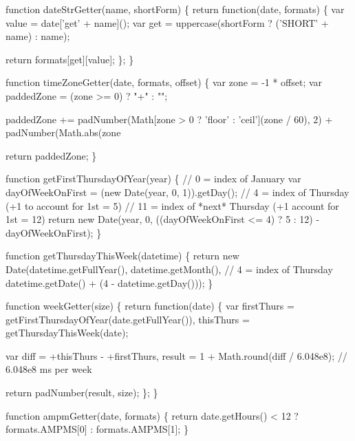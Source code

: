 \begin{DoxyCodeInclude}
{{{{\textcolor{keyword}{function} dateStrGetter(name, shortForm) \{
  \textcolor{keywordflow}{return} \textcolor{keyword}{function}(date, formats) \{
    var value = date[\textcolor{stringliteral}{'get'} + name]();
    var \textcolor{keyword}{get} = uppercase(shortForm ? (\textcolor{stringliteral}{'SHORT'} + name) : name);

    \textcolor{keywordflow}{return} formats[\textcolor{keyword}{get}][value];
  \};
\}

\textcolor{keyword}{function} timeZoneGetter(date, formats, offset) \{
  var zone = -1 * offset;
  var paddedZone = (zone >= 0) ? \textcolor{stringliteral}{"+"} : \textcolor{stringliteral}{""};

  paddedZone += padNumber(Math[zone > 0 ? \textcolor{stringliteral}{'floor'} : \textcolor{stringliteral}{'ceil'}](zone / 60), 2) +
                padNumber(Math.abs(zone %

  \textcolor{keywordflow}{return} paddedZone;
\}

\textcolor{keyword}{function} getFirstThursdayOfYear(year) \{
    \textcolor{comment}{// 0 = index of January}
    var dayOfWeekOnFirst = (\textcolor{keyword}{new} Date(year, 0, 1)).getDay();
    \textcolor{comment}{// 4 = index of Thursday (+1 to account for 1st = 5)}
    \textcolor{comment}{// 11 = index of *next* Thursday (+1 account for 1st = 12)}
    \textcolor{keywordflow}{return} \textcolor{keyword}{new} Date(year, 0, ((dayOfWeekOnFirst <= 4) ? 5 : 12) - dayOfWeekOnFirst);
\}

\textcolor{keyword}{function} getThursdayThisWeek(datetime) \{
    \textcolor{keywordflow}{return} \textcolor{keyword}{new} Date(datetime.getFullYear(), datetime.getMonth(),
      \textcolor{comment}{// 4 = index of Thursday}
      datetime.getDate() + (4 - datetime.getDay()));
\}

\textcolor{keyword}{function} weekGetter(size) \{
   \textcolor{keywordflow}{return} \textcolor{keyword}{function}(date) \{
      var firstThurs = getFirstThursdayOfYear(date.getFullYear()),
         thisThurs = getThursdayThisWeek(date);

      var diff = +thisThurs - +firstThurs,
         result = 1 + Math.round(diff / 6.048e8); \textcolor{comment}{// 6.048e8 ms per week}

      \textcolor{keywordflow}{return} padNumber(result, size);
   \};
\}

\textcolor{keyword}{function} ampmGetter(date, formats) \{
  \textcolor{keywordflow}{return} date.getHours() < 12 ? formats.AMPMS[0] : formats.AMPMS[1];
\}

}}}}
\end{DoxyCodeInclude}
